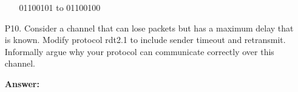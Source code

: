 \begin{enumerate}
\begin{enumerate}
    	01100101 to 01100100
    	
	\end{enumerate}
	
	\item[P10.] Consider a channel that can lose packets but has a maximum delay that is known. Modify protocol rdt2.1 to include sender timeout and retransmit.	Informally argue why your protocol can communicate correctly over this channel.
	
	\textbf{Answer:}
	
	\begin{figure}[H]
        \centering
\end{figure}
\end{enumerate}
